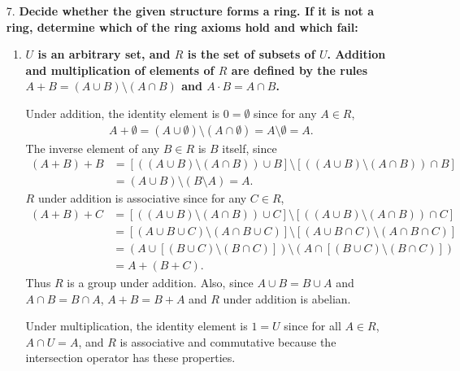 \documentclass[a4paper,12pt]{article}
\begin{document}
\begin{enumerate}
    \item[7.]
        \boldmath
        \textbf{Decide whether the given structure forms a ring. If it is not a ring, determine which of the ring axioms hold and which fail:} \par
        \unboldmath
        \begin{enumerate}
            \item
                \boldmath
                \textbf{$U$ is an arbitrary set, and $R$ is the set of subsets of $U$. Addition and multiplication of elements of $R$ are defined by the rules $A + B = (A \cup B) \setminus (A \cap B)$ and $A \cdot B = A \cap B$.} \par
                \unboldmath
                Under addition, the identity element is $0 = \emptyset$ since for any $A \in R$,
                \begin{align*}
                    A + \emptyset = (A \cup \emptyset) \setminus (A \cap \emptyset) = A \setminus \emptyset = A.
                \end{align*}
                The inverse element of any $B \in R$ is $B$ itself, since
                \begin{align*}
                    (A + B) + B &= [((A \cup B) \setminus (A \cap B)) \cup B] \setminus [((A \cup B) \setminus (A \cap B)) \cap B] \\
                    &= (A \cup B) \setminus (B \setminus A) = A.
                \end{align*}
                $R$ under addition is associative since for any $C \in R$,
                \begin{align*}
                    (A + B) + C &= [((A \cup B) \setminus (A \cap B)) \cup C] \setminus [((A \cup B) \setminus (A \cap B)) \cap C] \\
                    &= [(A \cup B \cup C) \setminus (A \cap B \cup C)] \setminus [(A \cup B \cap C) \setminus (A \cap B \cap C)] \\
                    &= (A \cup [(B \cup C) \setminus (B \cap C)]) \setminus (A \cap [(B \cup C) \setminus (B \cap C)]) \\
                    &= A + (B + C).
                \end{align*}
                Thus $R$ is a group under addition. Also, since $A \cup B = B \cup A$ and $A \cap B = B \cap A$, $A + B = B + A$ and $R$ under addition is abelian. \par
                Under multiplication, the identity element is $1 = U$ since for all $A \in R$, $A \cap U = A$, and $R$ is associative and commutative because the intersection operator has these properties. \par

\end{enumerate}
\end{enumerate}
\end{document}
